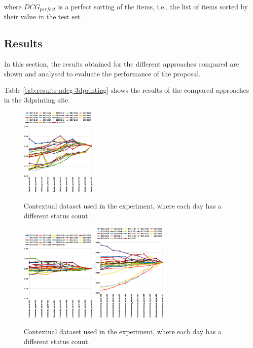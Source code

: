 \documentclass[preprint]{elsarticle}
\begin{document}
\begin{spacing}{1.5}
\noindent where $DCG_{perfect}$ is a perfect sorting of the items, i.e., the list of items sorted by their value in the test set.

\subsection{Results}

In this section, the results obtained for the different approaches compared are shown and analysed to evaluate the performance of the proposal.

Table \ref{tab:results-ndcg-3dprinting} shows the results of the compared approaches in the 3dprinting site.

\begin{figure}[htb]
    \centering
    \includegraphics[width=0.33\textwidth]{figures/ndcg-results-proposal-context-no-clustering.eps}
    \caption{Contextual dataset used in the experiment, where each day has a different status count.}
    \label{fig:ndcg-results-proposal-context-no-clustering}
    \includegraphics[width=0.33\textwidth]{figures/ndcg-results-proposal-context-fuzzy-clustering-max.eps}
    \label{fig:ndcg-results-proposal-context-fuzzy-clustering-max}
    \includegraphics[width=0.33\textwidth]{figures/ndcg-results-proposal-context-fuzzy-clustering-membership.eps}
    \caption{Contextual dataset used in the experiment, where each day has a different status count.}
    \label{fig:ndcg-results-proposal-context-fuzzy-clustering-membership}
\end{figure}


\end{spacing}
\end{document}
